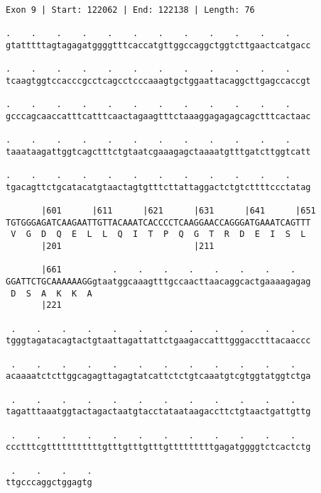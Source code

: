 \documentclass{article}
\begin{document}
\begin{Verbatim}[fontfamily=courier]
Exon 9 | Start: 122062 | End: 122138 | Length: 76

.    .    .    .    .    .    .    .    .    .    .    .    
gtatttttagtagagatggggtttcaccatgttggccaggctggtcttgaactcatgacc

.    .    .    .    .    .    .    .    .    .    .    .    
tcaagtggtccacccgcctcagcctcccaaagtgctggaattacaggcttgagccaccgt

.    .    .    .    .    .    .    .    .    .    .    .    
gcccagcaaccatttcatttcaactagaagtttctaaaggagagagcagctttcactaac

.    .    .    .    .    .    .    .    .    .    .    .    
taaataagattggtcagctttctgtaatcgaaagagctaaaatgtttgatcttggtcatt

.    .    .    .    .    .    .    .    .    .    .    .    
tgacagttctgcatacatgtaactagtgtttcttattaggactctgtcttttccctatag

       |601      |611      |621      |631      |641      |651
TGTGGGAGATCAAGAATTGTTACAAATCACCCCTCAAGGAACCAGGGATGAAATCAGTTT
 V  G  D  Q  E  L  L  Q  I  T  P  Q  G  T  R  D  E  I  S  L 
       |201                          |211                   

       |661          .    .    .    .    .    .    .    .   
GGATTCTGCAAAAAAGGgtaatggcaaagtttgccaacttaacaggcactgaaaagagag
 D  S  A  K  K  A                                           
       |221                                                 

 .    .    .    .    .    .    .    .    .    .    .    .   
tgggtagatacagtactgtaattagattattctgaagaccatttgggacctttacaaccc

 .    .    .    .    .    .    .    .    .    .    .    .   
acaaaatctcttggcagagttagagtatcattctctgtcaaatgtcgtggtatggtctga

 .    .    .    .    .    .    .    .    .    .    .    .   
tagatttaaatggtactagactaatgtacctataataagaccttctgtaactgattgttg

 .    .    .    .    .    .    .    .    .    .    .    .   
ccctttcgtttttttttttgtttgtttgtttgtttttttttgagatggggtctcactctg

 .    .    .    .
ttgcccaggctggagtg
\end{Verbatim}
\newpage
\end{document}
